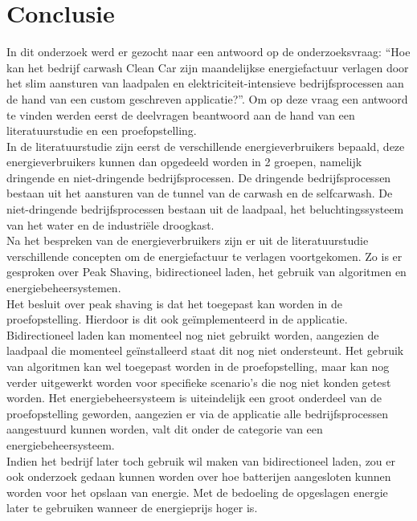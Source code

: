 
\chapter{Conclusie}%
\label{ch:conclusie}


In dit onderzoek werd er gezocht naar een antwoord op de onderzoeksvraag: “Hoe kan het bedrijf carwash Clean Car zijn maandelijkse energiefactuur verlagen door het slim aansturen van laadpalen en elektriciteit-intensieve bedrijfsprocessen aan de hand van een custom geschreven applicatie?”. Om op deze vraag een antwoord te vinden werden eerst de deelvragen beantwoord aan de hand van een literatuurstudie en een proefopstelling.\\

In de literatuurstudie zijn eerst de verschillende energieverbruikers bepaald, deze energieverbruikers kunnen dan opgedeeld worden in 2 groepen, namelijk dringende en niet-dringende bedrijfsprocessen. De dringende bedrijfsprocessen bestaan uit het aansturen van de  tunnel van de carwash en de selfcarwash. De niet-dringende bedrijfsprocessen bestaan uit de laadpaal, het beluchtingssysteem van het water en de industriële droogkast.\\

Na het bespreken van de energieverbruikers zijn er uit de literatuurstudie verschillende concepten om de energiefactuur te verlagen voortgekomen. Zo is er gesproken over Peak Shaving, bidirectioneel laden, het gebruik van algoritmen en energiebeheersystemen.\\

Het besluit over peak shaving is dat het toegepast kan worden in de proefopstelling. Hierdoor is dit ook geïmplementeerd in de applicatie. Bidirectioneel laden kan momenteel nog niet gebruikt worden, aangezien de laadpaal die momenteel geïnstalleerd staat dit nog niet ondersteunt. Het gebruik van algoritmen kan wel toegepast worden in de proefopstelling, maar kan nog verder uitgewerkt worden voor specifieke scenario’s die nog niet konden getest worden. Het energiebeheersysteem is uiteindelijk een groot onderdeel van de proefopstelling geworden, aangezien er via de applicatie alle bedrijfsprocessen aangestuurd kunnen worden, valt dit onder de categorie van een energiebeheersysteem.\\

Indien het bedrijf later toch gebruik wil maken van bidirectioneel laden, zou er ook onderzoek gedaan kunnen worden over hoe batterijen aangesloten kunnen worden voor het opslaan van energie. Met de bedoeling de opgeslagen energie later te gebruiken wanneer de energieprijs hoger is.